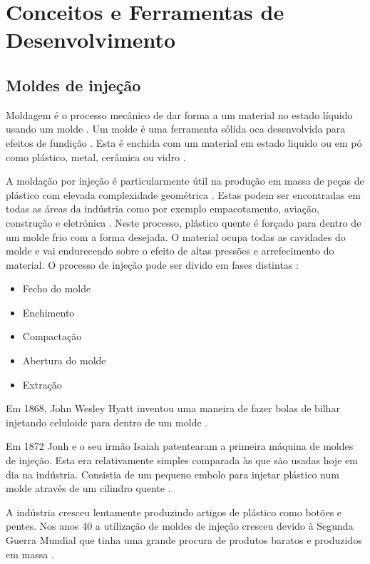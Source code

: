 \documentclass[11pt,twoside,a4paper]{report}
\begin{document}
\cleardoublepage
\chapter{Conceitos e Ferramentas de Desenvolvimento}
\label{chap:conceitos}
\section{Moldes de injeção}
Moldagem é o processo mecânico de dar forma a um material no estado líquido usando um molde \cite{definicao_moldagem,definicao_moldar}. Um molde é uma ferramenta sólida oca desenvolvida para efeitos de fundição \cite{definicao_molde}. Esta é enchida com um material em estado liquido ou em pó como plástico, metal, cerâmica ou vidro \cite{Williams1975,Trovant1998,JanneyMarkA.Knoxville1991,Yan2009}.\par
A moldação por injeção é particularmente útil na produção em massa de peças de plástico com elevada complexidade geométrica \cite{Shen,Shelesh}. Estas podem ser encontradas em todas as áreas da indústria como por exemplo empacotamento, aviação, construção e eletrónica \cite{Ozcelik}. Neste processo, plástico quente é forçado para dentro de um molde frio com a forma desejada. O material ocupa todas as cavidades do molde e vai endurecendo sobre o efeito de altas pressões e arrefecimento do material. O processo de injeção pode ser divido em fases distintas \cite{Shen}:
\vspace{-0.5cm}
\begin{itemize}[noitemsep]
	\item Fecho do molde
	\item Enchimento
	\item Compactação
	\item Abertura do molde
	\item Extração
\end{itemize}
\vspace{-0.5cm}
Em 1868, John Wesley Hyatt inventou uma maneira de fazer bolas de bilhar injetando celuloide para dentro de um molde \cite{historia,patente1868}.\par
Em 1872 Jonh e o seu irmão Isaiah patentearam a primeira máquina de moldes de injeção. Esta era relativamente simples comparada às que são usadas hoje em dia na indústria. Consistia de um pequeno embolo para injetar plástico num molde através de um cilindro quente \cite{historia,patente1872}.\par
A indústria cresceu lentamente produzindo artigos de plástico como botões e pentes. Nos anos 40 a utilização de moldes de injeção cresceu devido à Segunda Guerra Mundial que tinha uma grande procura de produtos baratos e produzidos em massa \cite{historia}.\par
\end{document}
